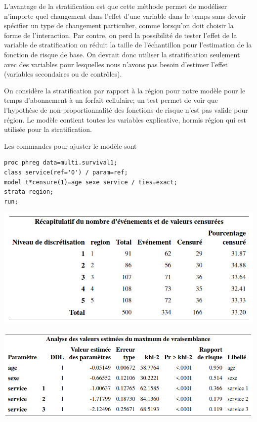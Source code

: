 \documentclass[
  11pt,
  letterpaper,
]{book}
\theoremstyle{definition}
\theoremstyle{definition}
\theoremstyle{definition}
\theoremstyle{remark}
\begin{document}
L'avantage de la stratification est que cette méthode permet de modéliser n'importe quel changement dans l'effet d'une variable dans le temps sans devoir spécifier un type de changement particulier, comme lorsqu'on doit choisir la forme de l'interaction. Par contre, on perd la possibilité de tester l'effet de la variable de stratification on réduit la taille de l'échantillon pour l'estimation de la fonction de risque de base. On devrait donc utiliser la stratification seulement avec des variables pour lesquelles nous n'avons pas besoin d'estimer l'effet (variables secondaires ou de contrôles).

On considère la stratification par rapport à la région pour notre modèle pour le temps d'abonnement à un forfait cellulaire; un test permet de voir que l'hypothèse de non-proportionnalité des fonctions de risque n'est pas valide pour région. Le modèle contient toutes les variables explicative, hormis région qui est utilisée pour la stratification.

Les commandes pour ajuster le modèle sont

\begin{verbatim}
proc phreg data=multi.survival1;
class service(ref='0') / param=ref;
model t*censure(1)=age sexe service / ties=exact;
strata region;
run;
\end{verbatim}

\begin{center}\includegraphics[width=0.75\linewidth]{figures/05-survie-e31} \end{center}

\begin{center}\includegraphics[width=0.85\linewidth]{figures/05-survie-e32} \end{center}
\end{document}

